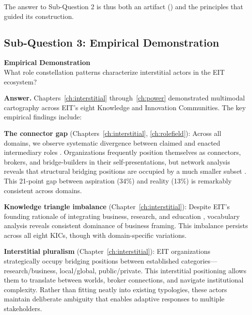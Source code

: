 \documentclass[../main.tex]{subfiles}
\begin{document}
The answer to Sub-Question 2 is thus both an artifact (\RoleBox{}) and the principles that guided its construction.

\subsection{Sub-Question 3: Empirical Demonstration}

\begin{subrq}
\textbf{Empirical Demonstration}\\
What role constellation patterns characterize interstitial actors in the EIT ecosystem?
\end{subrq}

\noindent\textbf{Answer.} Chapters~\ref{ch:interstitial} through~\ref{ch:power} demonstrated multimodal cartography across EIT's eight Knowledge and Innovation Communities. The key empirical findings include:

\textbf{The connector gap} (Chapters~\ref{ch:interstitial}, \ref{ch:rolefield}): Across all domains, we observe systematic divergence between claimed and enacted intermediary roles \cite{kivimaa2019innovation,howells2006intermediation}. Organizations frequently position themselves as connectors, brokers, and bridge-builders in their self-presentations, but network analysis reveals that structural bridging positions are occupied by a much smaller subset \cite{burt1992structural}. This 21-point gap between aspiration (34\%) and reality (13\%) is remarkably consistent across domains.

\textbf{Knowledge triangle imbalance} (Chapter~\ref{ch:interstitial}): Despite EIT's founding rationale of integrating business, research, and education \cite{etzkowitz2000dynamics,carayannis2009mode}, vocabulary analysis reveals consistent dominance of business framing. This imbalance persists across all eight KICs, though with domain-specific variations.

\textbf{Interstitial pluralism} (Chapter~\ref{ch:interstitial}): EIT organizations strategically occupy bridging positions between established categories---research/business, local/global, public/private. This interstitial positioning allows them to translate between worlds, broker connections, and navigate institutional complexity. Rather than fitting neatly into existing typologies, these actors maintain deliberate ambiguity that enables adaptive responses to multiple stakeholders.
\end{document}
